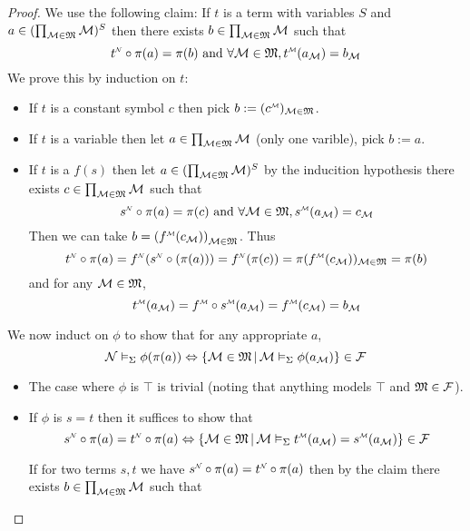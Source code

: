 \begin{proof}
    We use the following claim:
    If $t$ is a term with variables $S$ and 
    $a \in (\prod_{\mathcal{M} \in \mathfrak{M}} \mathcal{M})^S$
    then there exists $b \in \prod_{\mathcal{M} \in \mathfrak{M}} \mathcal{M}$ such that 
    \[\modintp{\NN}{t}\circ \pi(a) = \pi(b) \text{ and } 
    \forall \MM \in \f{M}, \modintp{\MM}{t}(a_\MM) = b_\MM\]
    We prove this by induction on $t$:
    \begin{itemize}
        \item If $t$ is a constant symbol $c$ then pick 
            $b := (\modintp{\MM}{c})_{\MM \in \f{M}}$.
        \item If $t$ is a variable then let 
            $a \in \prod_{\mathcal{M} \in \mathfrak{M}} \mathcal{M}$ (only one varible), 
            pick $b := a$.
        \item If $t$ is a $f(s)$ then let $a \in (\prod_{\mathcal{M} \in \mathfrak{M}} \mathcal{M})^S$
            by the inducition hypothesis there exists 
            $c \in \prod_{\mathcal{M} \in \mathfrak{M}} \mathcal{M}$ such that 
            \[\modintp{\NN}{s} \circ \pi(a) = \pi(c) \text{ and } 
            \forall \MM \in \f{M}, \modintp{\MM}{s}(a_\MM) = c_\MM\]
            Then we can take 
            $b = \brkt{\modintp{\MM}{f}(c_\MM)}_{\MM \in \f{M}}$. 
            Thus 
            \[\nnintp{t}\circ \pi(a) = \nnintp{f}(\nnintp{s}\circ (\pi(a)))
            = \nnintp{f}(\pi(c)) = \pi(\mmintp{f}(c_\MM))_{\MM \in \f{M}}
            = \pi(b)\]
            and for any $\mathcal{M} \in \mathfrak{M}$,
            \[\mmintp{t}(a_\MM) = \mmintp{f} \circ \mmintp{s} (a_\MM)
            = \mmintp{f}(c_\MM) = b_\MM\]
    \end{itemize}
    We now induct on $\phi$ to show that for any appropriate $a$,
    \[\mathcal{N} \vDash_{\Sigma} \phi(\pi(a)) \Leftrightarrow 
    \left\{\mathcal{M} \in \mathfrak{M} \,|\, \mathcal{M} \vDash_{\Sigma} \phi(a_{\mathcal{M}})\right\} \in \mathcal{F}\]
    \begin{itemize}
        \item The case where $\phi$ is $\top$ is trivial 
            (noting that anything models $\top$ and $\mathfrak{M} \in \mathcal{F}$).
        \item If $\phi$ is $s = t$ then it suffices to show that 
        \[  
            \modintp{\NN}{s}\circ \pi(a) = \modintp{\NN}{t}\circ \pi(a)
            \iff 
            \set{\MM \in \f{M} \st \MM \model{\Si} \modintp{\MM}{t}(a_\MM) = 
            \modintp{\MM}{s}(a_\MM)} \in \FF
        \]
        \begin{forward}
            If for two terms $s,t$ we have
            $\modintp{\NN}{s}\circ \pi(a) = \modintp{\NN}{t}\circ \pi(a)$
            then by the claim
            there exists $b \in \prod_{\mathcal{M} \in \mathfrak{M}} \mathcal{M}$ such that

\end{forward}
\end{itemize}
\end{proof}
